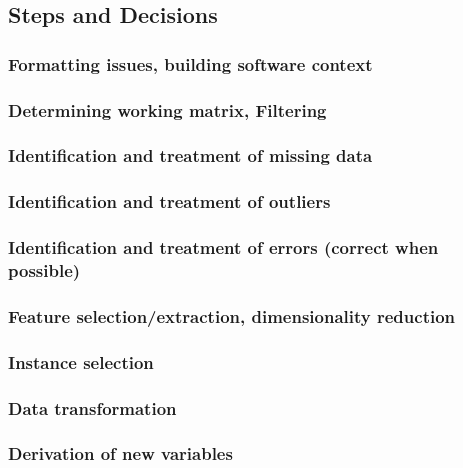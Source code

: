 
\subsection{Steps and Decisions}%
\label{sub:steps-decisions}

\subsubsection{Formatting issues, building software context}
\subsubsection{Determining working matrix, Filtering}
\subsubsection{Identification and treatment of missing data}
\subsubsection{Identification and treatment of outliers}
\subsubsection{Identification and treatment of errors (correct when possible)}
\subsubsection{Feature selection/extraction, dimensionality reduction}
\subsubsection{Instance selection}
\subsubsection{Data transformation}
\subsubsection{Derivation of new variables}



